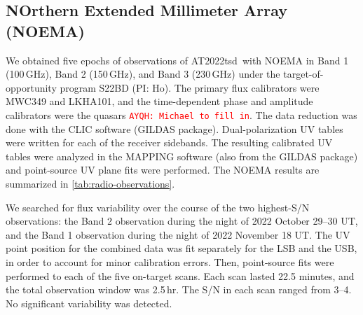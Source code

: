 \documentclass{nature_plusfigure}
\newcommand{\at}{AT2022tsd}
\newcommand{\ayqh}[1]{{\textcolor{red}{\texttt{AYQH: #1}}}}
\begin{document}
\begin{methods}
\subsection{NOrthern Extended Millimeter Array (NOEMA)}
\label{Methods:NOEMA}

We obtained five epochs of observations of \at\ with NOEMA in Band 1 (100\,GHz), Band 2 (150\,GHz), and Band 3 (230\,GHz) under the target-of-opportunity program S22BD (PI: Ho). The primary flux calibrators were MWC349 and LKHA101, and the time-dependent phase and amplitude calibrators were the quasars \ayqh{Michael to fill in}. The data reduction was done with the CLIC software (GILDAS package\cite{GILDAS}). 
Dual-polarization UV tables were written for each of the receiver sidebands. The resulting calibrated UV tables were analyzed in the MAPPING software (also from the GILDAS package) and point-source UV plane fits were performed.
The NOEMA results are summarized in \ref{tab:radio-observations}.

We searched for flux variability over the course of the two highest-S/N observations: the Band 2 observation during the night of 2022 October 29--30 UT, and the Band 1 observation during the night of 2022 November 18 UT.
The UV point position for the combined data was fit separately for the LSB and the USB, in
order to account for minor calibration errors.
Then, point-source fits were performed to each of the five on-target scans. Each scan lasted 22.5 minutes, and the total observation window was 2.5\,hr. The S/N in each scan ranged from 3--4. No significant variability was detected.




\end{methods}
\end{document}
